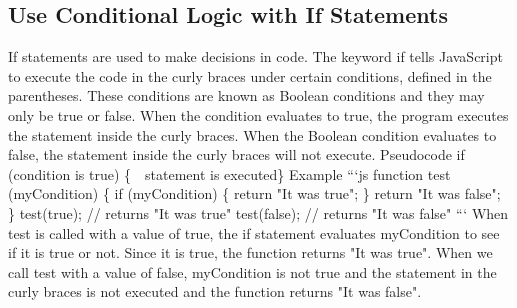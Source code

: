 \documentclass{article}%
\begin{document}
\subsection{Use Conditional Logic with If Statements}%
\label{subsec:UseConditionalLogicwithIfStatements}%
If statements are used to make decisions in code. The keyword if tells JavaScript to execute the code in the curly braces under certain conditions, defined in the parentheses. These conditions are known as Boolean conditions and they may only be true or false.\newline%
When the condition evaluates to true, the program executes the statement inside the curly braces. When the Boolean condition evaluates to false, the statement inside the curly braces will not execute.\newline%
Pseudocode\newline%
if (condition is true) \{~~statement is executed\}\newline%
Example\newline%
```js\newline%
function test (myCondition) \{\newline%
  if (myCondition) \{\newline%
     return "It was true";\newline%
  \}\newline%
  return "It was false";\newline%
\}\newline%
test(true);  // returns "It was true"\newline%
test(false); // returns "It was false"\newline%
```\newline%
When test is called with a value of true, the if statement evaluates myCondition to see if it is true or not. Since it is true, the function returns "It was true". When we call test with a value of false, myCondition is not true and the statement in the curly braces is not executed and the function returns "It was false".\newline%

%
\end{document}
